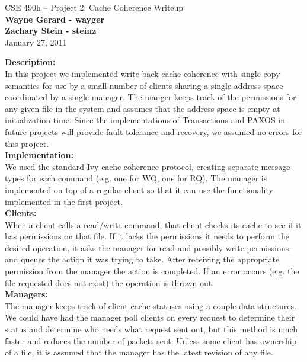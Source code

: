 \documentclass[11pt]{article}
\begin{document}
\begin{center}
{\large CSE 490h -- Project 2: Cache Coherence Writeup} \\
\textbf{Wayne Gerard - wayger} \\
\textbf{Zachary Stein - steinz} \\
January 27, 2011
\end{center}

\textbf{Description:} \\

In this project we implemented write-back cache coherence with single copy semantics for use by a small number of clients sharing a single address space coordinated by a single manager. 
The manger keeps track of the permissions for any given file in the system and assumes that the address space is empty at initialization time.
Since the implementations of Transactions and PAXOS in future projects will provide fault tolerance and recovery, we assumed no errors for this project. \\

\textbf{Implementation:} \\

We used the standard Ivy cache coherence protocol, creating separate message types for each command (e.g. one for WQ, one for RQ).
The manager is implemented on top of a regular client so that it can use the functionality implemented in the first project. \\

\textbf{Clients:} \\

When a client calls a read/write command, that client checks its cache to see if it has permissions on that file. If it lacks the permissions it needs to perform the desired operation, it asks the 
manager for read and possibly write permissions, and queues the action it was trying to take. After receiving the appropriate 
permission from the manager the action is completed. If an error occurs (e.g. the file requested does not exist) the operation is thrown out. \\

\textbf{Managers:} \\ 

The manager keeps track of client cache statuses using a couple data structures. We could have had the manager poll clients on every request to 
determine their status and determine who needs what request sent out, but this method is much faster and reduces the number of packets sent. Unless some
client has ownership of a file, it is assumed that the manager has the latest revision of any file.\\
\end{document}
